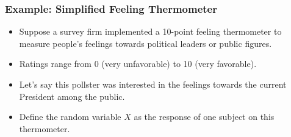 \documentclass[handout]{beamer} %
\begin{document}
\begin{frame}
\frametitle{Example: Simplified Feeling Thermometer}
    \begin{itemize}
        \item Suppose a survey firm implemented a 10-point feeling thermometer to measure people's feelings towards political leaders or public figures.
        \pause
        \item Ratings range from 0 (very unfavorable) to 10 (very favorable).
        \pause
        \item Let's say this pollster was interested in the feelings towards the current President among the public.
        \pause
        \item Define the random variable \( X \) as the response of one subject on this thermometer.
    \end{itemize}
\end{frame}
\end{document}
